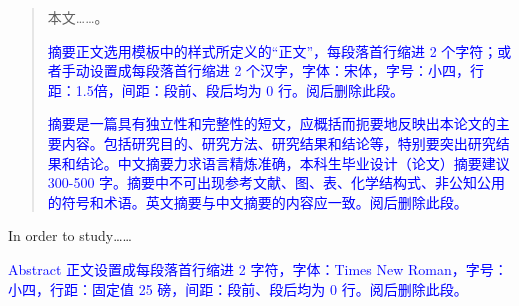 %
%
%
%
%

\begin{abstract}
  本文……。
  
  \textcolor{blue}{摘要正文选用模板中的样式所定义的“正文”，每段落首行缩进 2 个字符；或者手动设置成每段落首行缩进 2 个汉字，字体：宋体，字号：小四，行距：1.5倍，间距：段前、段后均为 0 行。阅后删除此段。}
  
  \textcolor{blue}{摘要是一篇具有独立性和完整性的短文，应概括而扼要地反映出本论文的主要内容。包括研究目的、研究方法、研究结果和结论等，特别要突出研究结果和结论。中文摘要力求语言精炼准确，本科生毕业设计（论文）摘要建议 300-500 字。摘要中不可出现参考文献、图、表、化学结构式、非公知公用的符号和术语。英文摘要与中文摘要的内容应一致。阅后删除此段。}
  
  \end{abstract}
  
  \begin{abstractEn}
  In order to study……
  
  \textcolor{blue}{Abstract 正文设置成每段落首行缩进 2 字符，字体：Times New Roman，字号：小四，行距：固定值 25 磅，间距：段前、段后均为 0 行。阅后删除此段。}
  \end{abstractEn}
  
